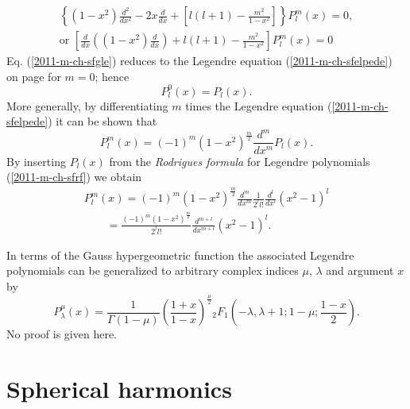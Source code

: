 \begin{equation}
\begin{split}
\left\{
(1-x^2)\frac{d^2}{dx^2}
-2x  \frac{d }{dx }
+
\left[ l(l+1)-\frac{m^2}{1-x^2} \right] \right\} P_l^m(x)= 0,
\\
\textrm{or } \left[  \frac{d }{dx }\left((1-x^2)\frac{d }{dx }\right)
+
 l(l+1)-\frac{m^2}{1-x^2} \right]  P_l^m(x)= 0
\end{split}
\label{2011-m-ch-sfgle}
\end{equation}
Eq. (\ref{2011-m-ch-sfgle})
reduces to the Legendre equation
 (\ref{2011-m-ch-sfelpede})
on page \pageref{2011-m-ch-sfelpede} for  $m=0$;
hence
\begin{equation}
P_l^0(x)=P_l(x).
\end{equation}
More generally,
by differentiating $m$ times the Legendre equation (\ref{2011-m-ch-sfelpede})
it can be shown that
\begin{equation}
P_l^m(x)=(-1)^m(1-x^2)^\frac{m}{2} \frac{d^m}{dx^m}P_l(x).
\end{equation}
By inserting $P_l(x)$ from the
{\em Rodrigues formula}
for Legendre polynomials (\ref{2011-m-ch-sfrf})
we obtain
\begin{equation}
\begin{split}
P_l^m(x)=
(-1)^m(1-x^2)^\frac{m}{2} \frac{d^m}{dx^m} \frac{1}{2^ll!}\frac{d^l}{dx^l}(x^2-1)^l
\\
\qquad
=
\frac{(-1)^m(1-x^2)^\frac{m}{2}}{2^ll!} \frac{d^{m+l}}{dx^{m+l}}(x^2-1)^l
.
\end{split}
\end{equation}

In terms of the Gauss hypergeometric function
the associated Legendre polynomials can be generalized to
arbitrary complex indices $\mu$, $\lambda$ and argument $x$ by
\begin{equation}
P^\mu_\lambda (x) =
\frac{1}{\Gamma (1-\mu )}\left(\frac{1+x}{1-x}\right)^\frac{\mu}{2}
{}_2F_1
\left(
-\lambda , \lambda  +1; 1-\mu ;\frac{1-x}{2}
\right).
\end{equation}
No proof is given here.

\section{Spherical harmonics}
\label{2011-m-ch-sfshar}


